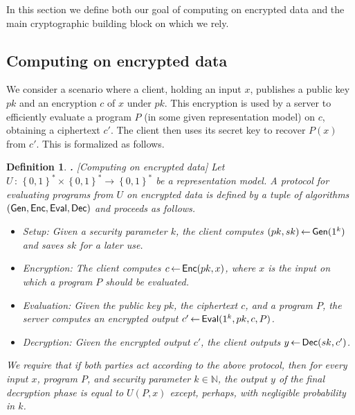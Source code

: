 \documentclass{article}
\newcommand{\fnrngdom}[2]{#1\to#2}
\newcommand{\fndef}[3]{{#1\,:\,\fnrngdom{#2}{#3}}}
\newcommand{\set}[1]{\left\{#1\right\}}
\newtheorem{DEFINITION}{Definition}[section]
\newenvironment{definition}{\begin{DEFINITION} \hspace{-.85em} {\bf .} \rm}%
	{\end{DEFINITION}}
\newcommand{\from}{{\,\leftarrow\,}}
\newcommand{\samp}[2]{#1\from #2}
\newcommand{\bools}[1][]{{\set{0,1}}^{#1}}
\newcommand{\bp}{\mbox{BP}\;}
\newcommand{\gen}{{\sf Gen}}
\newcommand{\enc}{{\sf Enc}}
\newcommand{\eval}{{\sf Eval}}
\newcommand{\dec}{{\sf Dec}}
\newcommand{\N}{{\mathbb{N}}}
\newcommand{\ot}{\mbox{OT}\;}
\begin{document}
In this section we define both our goal of computing on encrypted
data and the main cryptographic building block on which we rely.

\subsection{Computing on encrypted data} \label{sec-clientserver}

We consider a scenario where a client, holding an input $x$,
publishes a public key $pk$ and an encryption $c$ of $x$ under $pk$.
This encryption is used by a server to efficiently evaluate a
program $P$ (in some given representation model) on $c$, obtaining a
ciphertext $c'$. The client then uses its secret key to recover
$P(x)$ from $c'$. This is formalized as follows.


\begin{definition}[Computing on encrypted data]
\label{def-cl-serv} Let
$\fndef{U}{\bools[*]\times\bools[*]}{\bools[*]}$ be a
representation model. A {\em protocol for evaluating programs from
$U$ on encrypted data} is defined by a tuple of algorithms
$(\gen,\enc,\eval,\dec)$ and proceeds as follows.
\begin{itemize}
\item {\sc Setup:} Given a security parameter $k$,
the client computes $\samp{(pk,sk)}{\gen(1^k)}$ and saves $sk$ for a
later use.
\item {\sc Encryption:} The client
computes $\samp{c}\enc(pk,x)$, where $x$ is the input on which a
program $P$ should be evaluated.
\item {\sc Evaluation:} Given the public key
$pk$, the ciphertext $c$, and a program $P$, the server computes an
encrypted output $\samp{c'}{\eval(1^k,pk,c,P)}$.
\item {\sc Decryption:} Given the
encrypted output $c'$, the client outputs $\samp{y}{\dec(sk,c')}$.
\end{itemize}
We require that if both parties act according to the above protocol,
then for every input $x$, program $P$, and security parameter
$k\in{\N}$, the output $y$ of the final decryption phase is equal to
$U(P,x)$ except, perhaps, with negligible probability in $k$.
\end{definition}
\end{document}
